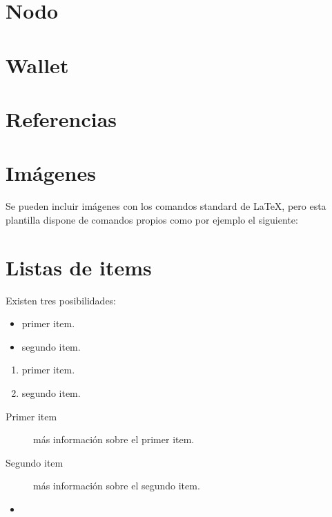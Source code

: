 \section{Nodo}


\section{Wallet}


\section{Referencias}



\section{Imágenes}

Se pueden incluir imágenes con los comandos standard de \LaTeX, pero esta plantilla dispone de comandos propios como por ejemplo el siguiente:




\section{Listas de items}

Existen tres posibilidades:

\begin{itemize}
	\item primer item.
	\item segundo item.
\end{itemize}

\begin{enumerate}
	\item primer item.
	\item segundo item.
\end{enumerate}

\begin{description}
	\item[Primer item] más información sobre el primer item.
	\item[Segundo item] más información sobre el segundo item.
\end{description}
	
\begin{itemize}
\item 
\end{itemize}

